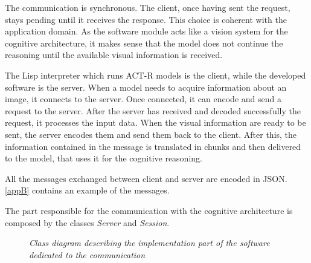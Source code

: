 		The communication is synchronous. 
		The client, once having sent the request, stays pending until it receives the response. 
		This choice is coherent with the application domain. 
		As the software module acts like a vision system for the cognitive architecture, it makes sense that the model does not continue the reasoning until the available visual information is received.

		The \mbox{Lisp} interpreter which runs \mbox{ACT-R} models is the client, while the developed software is the server.  	
		When a model needs to acquire information about an image, it connects to the server. 
		Once connected, it can encode and send a request to the server. 
		After the server has received and decoded successfully the request, it processes the input data. When the visual information are ready to be sent, the server encodes them and send them back to the client. 
		After this, the information contained in the message is translated in chunks and then delivered to the model, that uses it for the cognitive reasoning.

		All the messages exchanged between client and server are encoded in \mbox{JSON}. 
		\ref{appB} contains an example of the messages.


		The part responsible for the communication with the cognitive architecture is composed by the classes \emph{Server} and \emph{Session}. 

		\begin{figure}[h]
		  \begin{center} 
		  \end{center} 
		  \caption{\textit{Class diagram describing the implementation part of the software dedicated to the communication}}  
		  \label{fig:impl_feat_extraction}
	 	\end{figure}	



